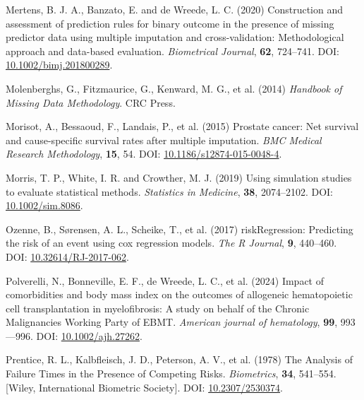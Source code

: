 \documentclass[
  letterpaper,
  DIV=11,
  numbers=noendperiod]{scrreprt}
\newlength{\cslhangindent}
\newlength{\cslentryspacingunit} %
\newenvironment{CSLReferences}[2] %
 {%
  \setlength{\parindent}{0pt}
  \ifodd #1
  \let\oldpar\par
  \def\par{\hangindent=\cslhangindent\oldpar}
  \fi
  \setlength{\parskip}{#2\cslentryspacingunit}
 }%
 {}
\begin{document}
\begin{CSLReferences}{1}{0}
\leavevmode{}%
Mertens, B. J. A., Banzato, E. and de Wreede, L. C. (2020) Construction
and assessment of prediction rules for binary outcome in the presence of
missing predictor data using multiple imputation and cross-validation:
{Methodological} approach and data-based evaluation. \emph{Biometrical
Journal}, \textbf{62}, 724--741. DOI:
\href{https://doi.org/10.1002/bimj.201800289}{10.1002/bimj.201800289}.

\leavevmode{}%
Molenberghs, G., Fitzmaurice, G., Kenward, M. G., et al. (2014)
\emph{Handbook of {Missing Data Methodology}}. CRC Press.

\leavevmode{}%
Morisot, A., Bessaoud, F., Landais, P., et al. (2015) Prostate cancer:
Net survival and cause-specific survival rates after multiple
imputation. \emph{BMC Medical Research Methodology}, \textbf{15}, 54.
DOI:
\href{https://doi.org/10.1186/s12874-015-0048-4}{10.1186/s12874-015-0048-4}.

\leavevmode{}%
Morris, T. P., White, I. R. and Crowther, M. J. (2019) Using simulation
studies to evaluate statistical methods. \emph{Statistics in Medicine},
\textbf{38}, 2074--2102. DOI:
\href{https://doi.org/10.1002/sim.8086}{10.1002/sim.8086}.

\leavevmode{}%
Ozenne, B., Sørensen, A. L., Scheike, T., et al. (2017)
{riskRegression}: {Predicting} the risk of an event using cox regression
models. \emph{The R Journal}, \textbf{9}, 440--460. DOI:
\href{https://doi.org/10.32614/RJ-2017-062}{10.32614/RJ-2017-062}.

\leavevmode{}%
Polverelli, N., Bonneville, E. F., de Wreede, L. C., et al. (2024)
Impact of comorbidities and body mass index on the outcomes of
allogeneic hematopoietic cell transplantation in myelofibrosis: {A}
study on behalf of the {Chronic Malignancies Working Party} of {EBMT}.
\emph{American journal of hematology}, \textbf{99}, 993---996. DOI:
\href{https://doi.org/10.1002/ajh.27262}{10.1002/ajh.27262}.

\leavevmode{}%
Prentice, R. L., Kalbfleisch, J. D., Peterson, A. V., et al. (1978) The
{Analysis} of {Failure Times} in the {Presence} of {Competing Risks}.
\emph{Biometrics}, \textbf{34}, 541--554. {[}Wiley, International
Biometric Society{]}. DOI:
\href{https://doi.org/10.2307/2530374}{10.2307/2530374}.


\end{CSLReferences}
\end{document}
